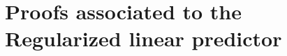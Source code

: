 \documentclass{article}
\begin{document}


\color{black}

\newpage


\newpage


\appendix

\section{Proofs associated to the Regularized linear predictor}
\end{document}

